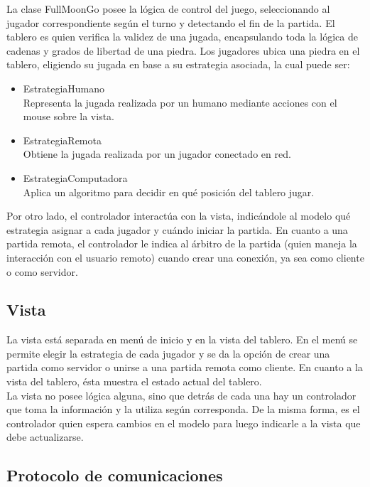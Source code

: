\documentclass[11pt]{article}
\begin{document}
La clase FullMoonGo posee la l\'ogica de control del juego, seleccionando al jugador correspondiente seg\'un el turno y
detectando el fin de la partida. El tablero es quien verifica la validez de una jugada, encapsulando toda la l\'ogica de cadenas y grados de libertad de una piedra.
Los jugadores ubica una piedra en el tablero, eligiendo su jugada en base a su estrategia asociada, la cual puede ser:
\begin{itemize}
 \item EstrategiaHumano\\
      Representa la jugada realizada por un humano mediante acciones con el mouse sobre la vista.
 \item EstrategiaRemota\\
      Obtiene la jugada realizada por un jugador conectado en red.
 \item	EstrategiaComputadora \\
      Aplica un algoritmo para decidir en qu\'e posici\'on del tablero jugar.
\end{itemize}

Por otro lado, el controlador interact\'ua con la vista, indic\'andole al modelo qu\'e estrategia asignar a cada jugador y
cu\'ando iniciar la partida. En cuanto a una partida remota, el controlador le indica al \'arbitro de la partida (quien maneja la interacci\'on 
con el usuario remoto) cuando crear una conexi\'on, ya sea como cliente o como servidor.

\subsection{Vista}
\label{sec-4.1}

La vista est\'a separada en men\'u de inicio y en la vista del tablero.
En el men\'u se permite elegir la estrategia de cada jugador y se da la opci\'on de crear una partida como servidor o unirse a una partida remota como cliente.
En cuanto a la vista del tablero, \'esta muestra el estado actual del tablero. \\
La vista no posee l\'ogica alguna, sino que detr\'as de cada una hay un controlador que toma la informaci\'on y la utiliza seg\'un corresponda. 
De la misma forma, es el controlador quien espera cambios en el modelo para luego indicarle a la vista que debe actualizarse.


\subsection{Protocolo de comunicaciones}
\label{sec-4.2}
  
\end{document}
